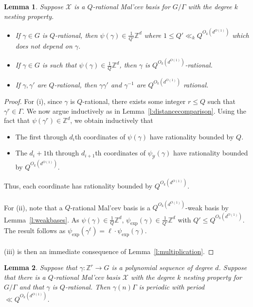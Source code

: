\documentclass[11pt, a4paper]{amsart}
\theoremstyle{plain}
\theoremstyle{plain}
\newtheorem{lemma}{Lemma}
\theoremstyle{definition}
\theoremstyle{remark}
\numberwithin{equation}{section}
\numberwithin{lemma}{section}
\numberwithin{proposition}{section}
\numberwithin{corollary}{section}
\numberwithin{definition}{section}
\numberwithin{claim}{section}
\begin{document}
\begin{lemma}\label{l:multiplyrational}
Suppose $\mathcal{X}$ is a $Q$-rational Mal'cev basis for $G/\Gamma$ with the degree $k$ nesting property. \begin{itemize}
\item[(i)] If $\gamma \in G$ is $Q$-rational, then $\psi(\gamma) \in \frac{1}{Q'}\mathbb{Z}^d$ where $1 \le Q' \ll_k Q^{O_k(d^{O(1)})}$ which does not depend on $\gamma$.
\item[(ii)] If $\gamma \in G$ is such that $\psi(\gamma) \in \frac{1}{Q} \mathbb{Z}^d$, then $\gamma$ is $Q^{O_k(d^{O(1)})}$-rational.
\item[(iii)] If $\gamma, \gamma'$ are $Q$-rational, then $\gamma \gamma'$ and $\gamma^{-1}$ are $Q^{O_k(d^{O(1)})}$ rational.
\end{itemize}
\end{lemma}
\begin{proof}
For (i), since $\gamma$ is $Q$-rational, there exists some integer $r \le Q$ such that $\gamma^r \in \Gamma$. We now argue inductively as in Lemma~\ref{l:distancecomparison}. Using the fact that $\psi(\gamma^r) \in \mathbb{Z}^d$, we obtain inductively that
\begin{itemize}
\item[1.] The first through $d_i$th coordinates of $\psi(\gamma)$ have rationality bounded by $Q$.
\item[2.] The $d_i + 1$th through $d_{i + 1}$th coordinates of $\psi_{\mathcal{Y}}(\gamma)$ have rationality bounded by $Q^{O_k(d^{O(1)})}$. 
\end{itemize}
Thus, each coordinate has rationality bounded by $Q^{O_k(d^{O(1)})}$. \\\\
For (ii), note that a $Q$-rational Mal'cev basis is a $Q^{O_k(d^{O(1)})}$-weak basis by Lemma~\ref{l:weakbases}. As $\psi(\gamma) \in \frac{1}{Q}\mathbb{Z}^d$, $\psi_{\exp}(\gamma) \in \frac{1}{Q'}\mathbb{Z}^d$ with $Q' \le Q^{O_k(d^{O(1)})}$. The result follows as $\psi_{\exp}(\gamma^\ell) = \ell \cdot \psi_{\exp}(\gamma)$. \\\\
(iii) is then an immediate consequence of Lemma~\ref{l:multiplication}.
\end{proof}

\begin{lemma}\label{l:rationalpolynomialsequence}
Suppose that $\gamma\colon \mathbb{Z}^r \to G$ is a polynomial sequence of degree $d$. Suppose that there is a $Q$-rational Mal'cev basis $\mathcal{X}$ with the degree $k$ nesting property for $G/\Gamma$ and that $\gamma$ is $Q$-rational. Then $\gamma(n)\Gamma$ is periodic with period $\ll Q^{O_k(d^{O(1)})}$. 
\end{lemma}
\end{document}
